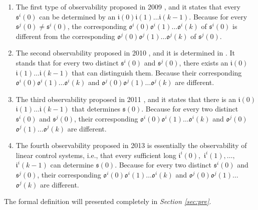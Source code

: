 
\begin{enumerate}
	\item The first type of observability proposed in 2009 \cite{cheng2009controllability}, and it states that every $\mathfrak{s}^{i}(0)$ can be determined by an $\mathfrak{i}(0)$$\mathfrak{i}(1)\ldots$$\mathfrak{i}(k-1)$. Because for every $\mathfrak{s}^{j}(0)\ne$$\mathfrak{s}^{i}(0)$, the corresponding $\mathfrak{o}^{i}(0)$$\mathfrak{o}^{i}(1)\ldots$$\mathfrak{o}^{i}(k)$ of $\mathfrak{s}^{i}(0)$ is different from the corresponding $\mathfrak{o}^{j}(0)$$\mathfrak{o}^{j}(1)\ldots$$\mathfrak{o}^{j}(k)$ of $\mathfrak{s}^{j}(0)$. %
	\item 
	The second observability proposed in 2010 \cite{Zhao2010Input}, and it is determined in \cite{Li2015Controllability}. It stands that for every two distinct $\mathfrak{s}^{i}(0)$ and $\mathfrak{s}^{j}(0)$, there exists an $\mathfrak{i}(0)$$\mathfrak{i}(1)\ldots$$\mathfrak{i}(k-1)$ that can distinguish them. Because their corresponding $\mathfrak{o}^{i}(0)$$\mathfrak{o}^{i}(1)\ldots$$\mathfrak{o}^{i}(k)$ and $\mathfrak{o}^{j}(0)$$\mathfrak{o}^{j}(1)\ldots$$\mathfrak{o}^{j}(k)$ are different. %
	\item The third observability proposed in 2011 \cite{Cheng2011Identification}, and it states that there is an $\mathfrak{i}(0)$$\mathfrak{i}(1)\ldots$$\mathfrak{i}(k-1)$ that determines $\mathfrak{s}(0)$. Because for every two distinct $\mathfrak{s}^{i}(0)$ and $\mathfrak{s}^{j}(0)$, their corresponding $\mathfrak{o}^{i}(0)$$\mathfrak{o}^{i}(1)\ldots$$\mathfrak{o}^{i}(k)$ and $\mathfrak{o}^{j}(0)$$\mathfrak{o}^{j}(1)\ldots$$\mathfrak{o}^{j}(k)$ are different.
	
	\item  The fourth observability proposed in 2013 \cite{Fornasini2013Observability} is essentially the observability of linear control systems, i.e., that every sufficient long $\mathfrak{i}^{i}(0),$ $\mathfrak{i}^{i}(1),\ldots,$ $\mathfrak{i}^{i}(k-1)$ can determine $\mathfrak{s}(0)$. Because for every two distinct $\mathfrak{s}^{i}(0)$ and $\mathfrak{s}^{j}(0)$, their corresponding $\mathfrak{o}^{i}(0)$$\mathfrak{o}^{i}(1)\ldots$$\mathfrak{o}^{i}(k)$ and $\mathfrak{o}^{j}(0)$$\mathfrak{o}^{j}(1)\ldots$$\mathfrak{o}^{j}(k)$ are different. %
\end{enumerate}
 The formal definition will presented completely in {\em Section \ref{sec:pre}}.

